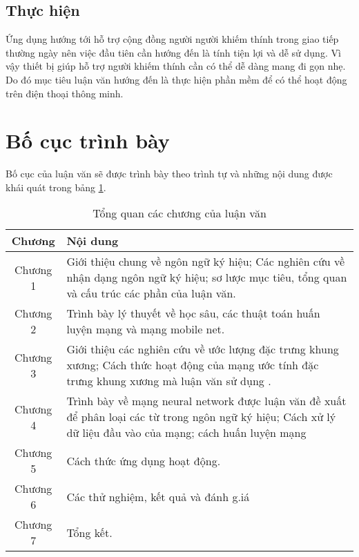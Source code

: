 \subsection{Thực hiện}
Ứng dụng hướng tới hỗ trợ cộng đồng người người khiếm thính trong giao tiếp thường ngày nên việc đầu tiên cần hướng đến là tính tiện lợi và dễ sử dụng. Vì vậy thiết bị giúp hỗ trợ người khiếm thính cần có thể dễ dàng mang đi gọn nhẹ. Do đó mục tiêu luận văn hướng đến là thực hiện phần mềm để có thể hoạt động trên điện thoại thông minh. 


\section{Bố cục trình bày}
\label{ss:bo_cuc_trinh_bay}
Bố cục của luận văn sẽ được trình bày theo trình tự và những nội dung được khái quát trong bảng \ref{table:bo_cuc_luan_van}.

\FloatBarrier
\begin{table}[h]
\caption{Tổng quan các chương của luận văn}
\label{table:bo_cuc_luan_van}
\centering
\begin{center}
\begin{tabular}{|c|p{13cm}|} 
 \hline
Chương  & Nội dung \\
 \hline
 Chương 1 & Giới thiệu chung về ngôn ngữ ký hiệu; Các nghiên cứu về nhận dạng ngôn ngữ ký hiệu; sơ lược mục tiêu, tổng quan và cấu trúc các phần của luận văn.\\
 \hline 
 Chương 2 & Trình bày lý thuyết về học sâu, các thuật toán huấn luyện mạng và mạng mobile net.\\
 \hline 
 Chương 3 & Giới thiệu các nghiên cứu về ước lượng đặc trưng khung xương; Cách thức hoạt động của mạng ước tính đặc trưng khung xương mà luận văn sử dụng .\\
 \hline
 Chương 4 & Trình bày về mạng neural network được luận văn đề xuất để phân loại các từ trong ngôn ngữ ký hiệu; Cách xử lý dữ liệu đầu vào của mạng; cách huấn luyện mạng \\
 \hline 
 Chương 5 & Cách thức ứng dụng hoạt động.\\
 \hline
 Chương 6 & Các thử nghiệm, kết quả và đánh g.iá\\
 \hline
 Chương 7 & Tổng kết.\\
 \hline
 
\end{tabular}
\end{center}
\end{table}
\FloatBarrier

